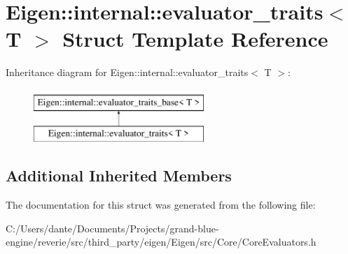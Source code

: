 \hypertarget{struct_eigen_1_1internal_1_1evaluator__traits}{}\section{Eigen\+::internal\+::evaluator\+\_\+traits$<$ T $>$ Struct Template Reference}
\label{struct_eigen_1_1internal_1_1evaluator__traits}
Inheritance diagram for Eigen\+::internal\+::evaluator\+\_\+traits$<$ T $>$\+:\begin{figure}[H]
\begin{center}
\leavevmode
\includegraphics[height=2.000000cm]{struct_eigen_1_1internal_1_1evaluator__traits}
\end{center}
\end{figure}
\subsection*{Additional Inherited Members}


The documentation for this struct was generated from the following file\+:\begin{DoxyCompactItemize}
\item 
C\+:/\+Users/dante/\+Documents/\+Projects/grand-\/blue-\/engine/reverie/src/third\+\_\+party/eigen/\+Eigen/src/\+Core/Core\+Evaluators.\+h\end{DoxyCompactItemize}
